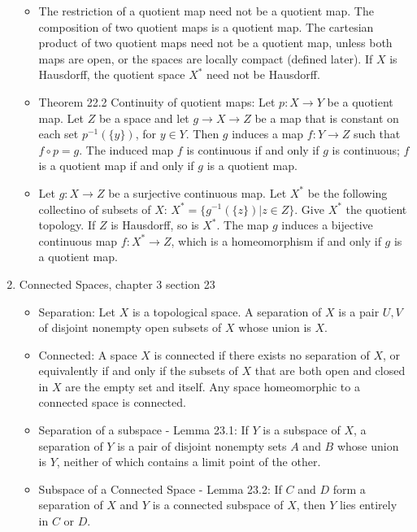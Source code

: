 \documentclass[12pt,letterpaper]{article}
\begin{document}
\begin{enumerate}
\begin{itemize}
    \item \label{thm:quotientMapGeneralProperties} The restriction of a quotient map need not be a quotient map. The composition of two quotient maps is a quotient map. The cartesian product of two quotient maps need not be a quotient map, unless both maps are open, or the spaces are locally compact (defined later). If $X$ is Hausdorff, the quotient space $X^*$ need not be Hausdorff.
    \item \label{thm:continuityQuotientMap} Theorem 22.2 Continuity of quotient maps: Let $p: X\rightarrow Y$ be a quotient map. Let $Z$ be a space and let $g\rightarrow X\rightarrow Z$ be a map that is constant on each set $p^{-1}(\{y\})$, for $y\in Y$. Then $g$ induces a map $f:Y\rightarrow Z$ such that $f\circ p = g$. The induced map $f$ is continuous if and only if $g$ is continuous; $f$ is a quotient map if and only if $g$ is a quotient map.
    \item \label{thm:HausdorffHomeomorphismQuotientMap} Let $g: X\rightarrow Z$ be a surjective continuous map. Let $X^*$ be the following collectino of subsets of $X$: $X^*=\{g^{-1}(\{z\}) | z\in Z\}$. Give $X^*$ the quotient topology. If $Z$ is Hausdorff, so is $X^*$. The map $g$ induces a bijective continuous map $f: X^*\rightarrow Z$, which is a homeomorphism if and only if $g$ is a quotient map.
  \end{itemize}
  \item \label{sec:connectedness} Connected Spaces, chapter 3 section 23
  \begin{itemize}
    \item \label{dfn:separation} Separation: Let $X$ is a topological space. A separation of $X$ is a pair $U,V$ of disjoint nonempty open subsets of $X$ whose union is $X$.
    \item \label{dfn:connected} Connected: A space $X$ is connected if there exists no separation of $X$, or equivalently if and only if the subsets of $X$ that are both open and closed in $X$ are the empty set and itself. Any space homeomorphic to a connected space is connected.
    \item \label{dfn:subspaceSeparation} Separation of a subspace - Lemma 23.1: If $Y$ is a subspace of $X$, a separation of $Y$ is a pair of disjoint nonempty sets $A$ and $B$ whose union is $Y$, neither of which contains a limit point of the other.
    \item \label{thm:subspaceOfConnected} Subspace of a Connected Space - Lemma 23.2: If $C$ and $D$ form a separation of $X$ and $Y$ is a connected subspace of $X$, then $Y$ lies entirely in $C$ or $D$.

\end{itemize}
\end{enumerate}
\end{document}

